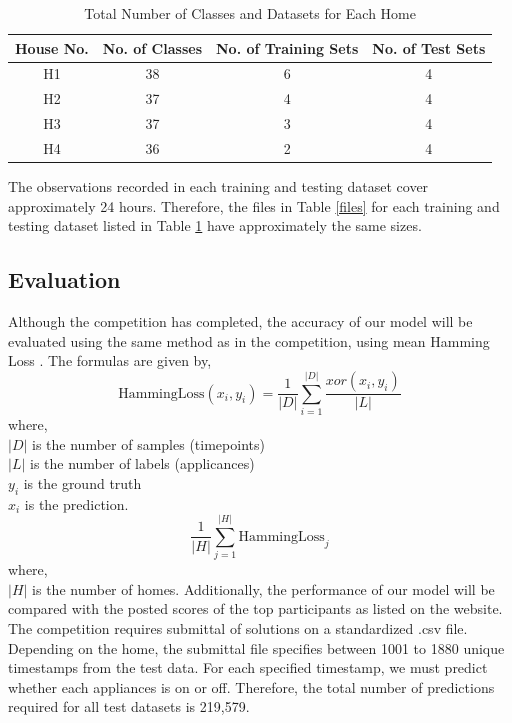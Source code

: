 \documentclass[11pt, letterpaper]{article}
\begin{document}
\begin{table}[H]
\caption{Total Number of Classes and Datasets for Each Home}\label{classes}
\begin{center}
\begin{tabular}{|c|c|c|c|}
\hline 
\textbf{House No.} & \textbf{No. of Classes} &\textbf{ No. of Training Sets} &\textbf{ No. of Test Sets}\tabularnewline
\hline 
H1 & 38 & 6 & 4\tabularnewline
\hline 
H2 & 37 & 4 & 4\tabularnewline
\hline 
H3 & 37 & 3 & 4\tabularnewline
\hline 
H4 & 36 & 2 & 4\tabularnewline
\hline 
\end{tabular}

\end{center}
\end{table}

The observations recorded in each training and testing dataset cover approximately 24 hours.  Therefore, the files in Table \ref{files} for each training and testing dataset listed in Table \ref{classes} have approximately the same sizes.

\subsection{Evaluation}
Although the competition has completed, the accuracy of our model will be evaluated using the same method as in the competition, using mean Hamming Loss \cite{Kaggle}. The formulas are given by,
\begin{equation}
\text{HammingLoss}(x_i,y_i) = \frac{1}{|D|}\sum_{i=1}^{|D|}\frac{xor(x_i,y_i)}{|L|}
\end{equation}
where,\\
$|D|$ is the number of samples (timepoints)\\
$|L|$ is the number of labels (applicances)\\
$y_i$ is the ground truth\\
$x_i$ is the prediction.\\
\begin{equation}
\frac{1}{|H|}\sum_{j=1}^{|H|}{\text{HammingLoss}_j}
\end{equation}
where,\\
$|H|$ is the number of homes. Additionally, the performance of our model will be compared with the posted scores of the top participants as listed on the website.  The competition requires submittal of solutions on a standardized .csv file.  Depending on the home, the submittal file specifies between 1001 to 1880 unique timestamps from the test data. For each specified timestamp, we must predict whether each appliances is on or off.  Therefore, the total number of predictions required for all test datasets is 219,579.      
\end{document}
